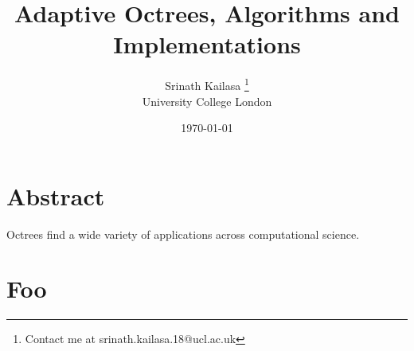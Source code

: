 \documentclass[12pt, a4, twoside]{article}
\title{Adaptive Octrees, Algorithms and Implementations}
\author{Srinath Kailasa \thanks{Contact me at srinath.kailasa.18@ucl.ac.uk} \\ \small University College London}
\date{\today}
\begin{document}
\maketitle

\section*{Abstract}

Octrees find a wide variety of applications across computational science.

\cite{Sundar:2008:SIAM}

\section*{Foo}


\printbibliography
\end{document}
